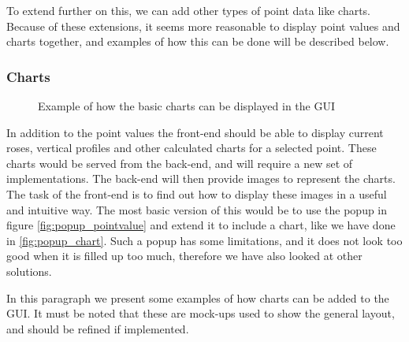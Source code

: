 \documentclass[11pt,a4paper,titlepage,oneside]{report}
\begin{document}
To extend further on this, we can add other types of point data like charts. Because of these extensions, it seems more reasonable to display point values and charts together, and examples of how this can be done will be described below.

\subsubsection{Charts}
\begin{figure}[!htb]
  \begin{center}
    \caption{Example of how the basic charts can be displayed in the GUI}
    \label{fig:gui_basicChart}
  \end{center}
\end{figure}
In addition to the point values the \gls{front-end} should be able to display current roses, vertical profiles and other calculated charts for a selected point. These charts would be served from the \gls{back-end}, and will require a new set of implementations. The \gls{back-end} will then provide images to represent the charts. The task of the \gls{front-end} is to find out how to display these images in a useful and intuitive way. The most basic version of this would be to use the popup in figure \ref{fig:popup_pointvalue} and extend it to include a chart, like we have done in \ref{fig:popup_chart}. Such a popup has some limitations, and it does not look too good when it is filled up too much, therefore we have also looked at other solutions. 

In this paragraph we present some examples of how charts can be added to the \gls{GUI}. It must be noted that these are mock-ups used to show the general layout, and should be refined if implemented.
\end{document}
